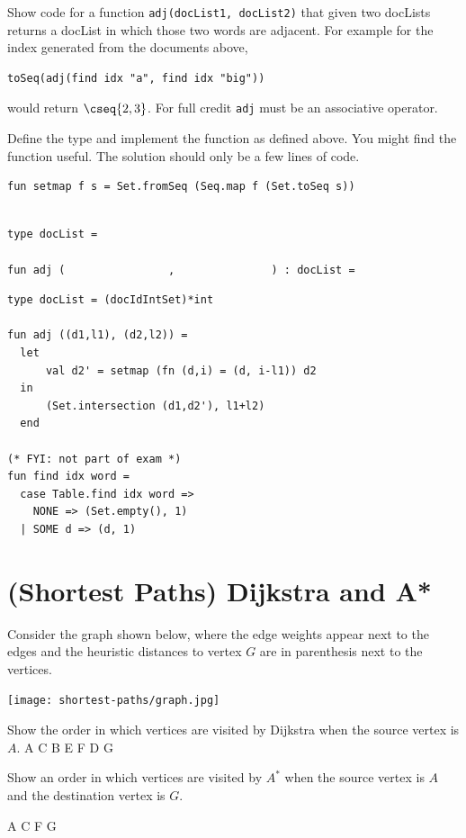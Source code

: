 \begin{problem}%

Show code for a function \texttt{adj(docList1, docList2)} that given
two docLists returns a docList in which those two words
are adjacent.  For example for the index generated from the documents
above, 
\begin{lstlisting}[language=caml,numbers=none]
toSeq(adj(find idx "a", find idx "big")) 
\end{lstlisting}
would return
$\cseq{2, 3}$.  For full credit \texttt{adj} must be an associative operator.

\ask
Define the  type and implement the function  as defined above.
You might find the function  useful. The solution should
only be a few lines of code.
\begin{lstlisting}[numbers=none]
fun setmap f s = Set.fromSeq (Seq.map f (Set.toSeq s)) 
\end{lstlisting}


\begin{lstlisting}[language=caml,numbers=none]

type docList = 

fun adj (                ,               ) : docList =

\end{lstlisting}


\sol
\begin{lstlisting}[language=caml,numbers=none]
type docList = (docIdIntSet)*int

fun adj ((d1,l1), (d2,l2)) = 
  let 
      val d2' = setmap (fn (d,i) = (d, i-l1)) d2
  in  
      (Set.intersection (d1,d2'), l1+l2)
  end

(* FYI: not part of exam *)
fun find idx word = 
  case Table.find idx word =>
    NONE => (Set.empty(), 1)
  | SOME d => (d, 1)
\end{lstlisting}
   
\end{problem}


\section{(Shortest Paths) Dijkstra and A*}
%


\begin{problem}[6.]

Consider the graph shown below, where the edge weights appear next to
the edges and the heuristic distances to vertex $G$ are in parenthesis
next to the vertices.
\begin{center}
  \texttt{[image: shortest-paths/graph.jpg]}
\end{center}

\ask
Show the order in which vertices are visited by Dijkstra when the source
vertex is $A$.
\sol
A C B E F D G


\ask Show an order in which vertices are visited by $A^*$ when
the source vertex is $A$ and the destination vertex is $G$.

\sol
A C F G 

\end{problem}

